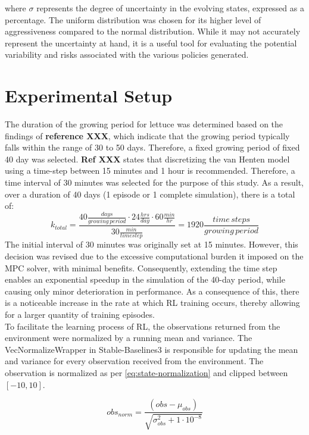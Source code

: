 where $\sigma$ represents the degree of uncertainty in the evolving states, expressed as a percentage. The uniform distribution was chosen for its higher level of aggressiveness compared to the normal distribution. While it may not accurately represent the uncertainty at hand, it is a useful tool for evaluating the potential variability and risks associated with the various policies generated.



\section{Experimental Setup} \label{section:experimental-setup}

The duration of the growing period for lettuce was determined based on the findings of \textbf{reference XXX}, which indicate that the growing period typically falls within the range of 30 to 50 days. Therefore, a fixed growing period of fixed 40 day was selected. \textbf{Ref XXX} states that discretizing the van Henten model using a time-step between 15 minutes and 1 hour is recommended. Therefore, a time interval of 30 minutes was selected for the purpose of this study. As a result, over a duration of 40 days (1 episode or 1 complete simulation), there is a total of:
$$
k_{total} = \frac{40 \frac{days}{growing \, period} \cdot 24 \frac{hrs}{day} \cdot 60 \frac{min}{hr}}{30 \frac{min}{timestep}} = 1920 \frac{time \, steps}{growing \, period}
$$
The initial interval of 30 minutes was originally set at 15 minutes. However, this decision was revised due to the excessive computational burden it imposed on the MPC solver, with minimal benefits. Consequently, extending the time step enables an exponential speedup in the simulation of the 40-day period, while causing only minor deterioration in performance. As a consequence of this, there is a noticeable increase in the rate at which RL training occurs, thereby allowing for a larger quantity of training episodes.
\\
To facilitate the learning process of RL, the observations returned from the environment were normalized by a running mean and variance. The VecNormalizeWrapper in Stable-Baselines3 is responsible for updating the mean and variance for every observation received from the environment. The observation is normalized as per \autoref{eq:state-normalization} and clipped between $[-10,10]$.

\begin{equation}\label{eq:state-normalization}
    obs_{norm} = \frac{(obs - \mu_{obs}) }{\sqrt{\sigma^2_{obs} + 1\cdot 10^{-8}}}
\end{equation}

